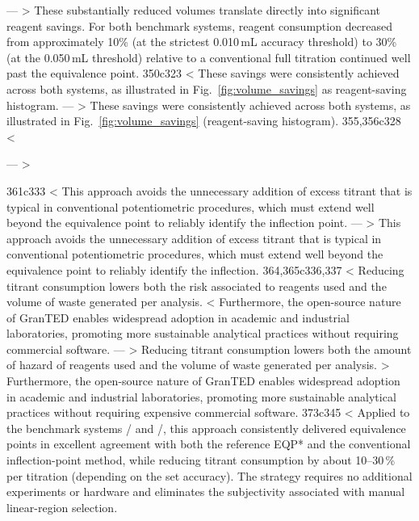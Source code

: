 ---
> These substantially reduced volumes translate directly into significant reagent savings. For both benchmark systems, reagent consumption decreased from approximately 10\% (at the strictest 0.010\,mL accuracy threshold) to 30\% (at the 0.050\,mL threshold) relative to a conventional full titration continued well past the equivalence point.
350c323
< These savings were consistently achieved across both systems, as illustrated in Fig.~\ref{fig:volume_savings} as reagent-saving histogram.
---
> These savings were consistently achieved across both systems, as illustrated in Fig.~\ref{fig:volume_savings} (reagent-saving histogram).
355,356c328
<   \caption{Reagent savings achieved by stopping at the optimal volume using different acceptance criteria (0.010, 0.020 and 0.050\,mL difference from the full-dataset EQP*).
<   Results are shown for both / and / systems ($n=6$ replicates each) and compared against the equivalence point} %
---
>   \caption{Reagent savings achieved by stopping at the optimal volume using different acceptance criteria (0.010, 0.020 and 0.050\,mL difference from the full-dataset EQP). Results are shown for both / and / systems ($n=6$ replicates each) and compared against the equivalence point and full titration endpoint}
361c333
< This approach avoids the unnecessary addition of excess titrant that is typical in conventional potentiometric procedures, which must extend well beyond the equivalence point to reliably identify the inflection point.
---
> This approach avoids the unnecessary addition of excess titrant that is typical in conventional potentiometric procedures, which must extend well beyond the equivalence point to reliably identify the inflection.
364,365c336,337
< Reducing titrant consumption lowers both the risk associated to reagents used and the volume of waste generated per analysis.
< Furthermore, the open-source nature of \textsf{GranTED} enables widespread adoption in academic and industrial laboratories, promoting more sustainable analytical practices without requiring commercial software.
---
> Reducing titrant consumption lowers both the amount of hazard of reagents used and the volume of waste generated per analysis.
> Furthermore, the open-source nature of \textsf{GranTED} enables widespread adoption in academic and industrial laboratories, promoting more sustainable analytical practices without requiring expensive commercial software.
373c345
< Applied to the benchmark systems / and /, this approach consistently delivered equivalence points in excellent agreement with both the reference EQP* and the conventional inflection-point method, while reducing titrant consumption by about 10--30\,\% per titration (depending on the set accuracy). The strategy requires no additional experiments or hardware and eliminates the subjectivity associated with manual linear-region selection.
